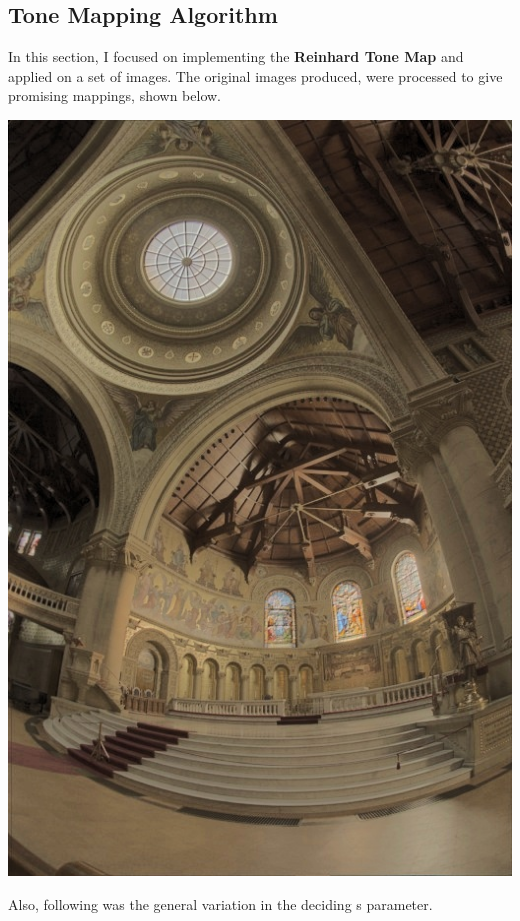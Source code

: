 \documentclass{article}
\begin{document}
    \subsection*{Tone Mapping Algorithm}
    In this section, I focused on implementing the \textbf{Reinhard Tone Map} and applied on a set of images. The original images produced, were processed to give promising mappings, shown below.
    \begin{center}
        \includegraphics[scale=.27]{./data/3/fnl.jpg}
    \end{center}
    Also, following was the general variation in the deciding s parameter.
\end{document}
